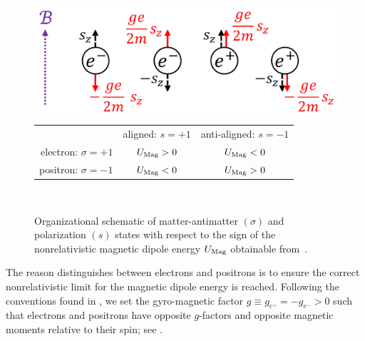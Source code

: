 \begin{figure}
 \centering
 \includegraphics[width=0.95\linewidth]{plots/schematic.png}\Bstrut\\
 \begin{tabular}{ r|c|c| }
 \multicolumn{1}{r}{}
 & \multicolumn{1}{c}{aligned: $s=+1$}
 & \multicolumn{1}{c}{anti-aligned: $s=-1$} \\
 \cline{2-3}
 electron: $\sigma=+1$ & $U_{\rm Mag}>0$ & $U_{\rm Mag}<0$ \TBstrut\\
 \cline{2-3}
 positron: $\sigma=-1$ & $U_{\rm Mag}<0$ & $U_{\rm Mag}>0$ \TBstrut\\
 \cline{2-3}
 \end{tabular}\\
 \caption{Organizational schematic of matter-antimatter $(\sigma)$ and polarization $(s)$ states with respect to the sign of the nonrelativistic magnetic dipole energy $U_{\rm Mag}$ obtainable from~. }
 \label{fig:schematic}
\end{figure}

The reason  distinguishes between electrons and positrons is to ensure the correct nonrelativistic limit for the magnetic dipole energy is reached. Following the conventions found in \cite{Tiesinga:2021myr}, we set the gyro-magnetic factor $g\equiv g_{e^{+}}=-g_{e^{-}}>0$ such that electrons and positrons have opposite $g$-factors and opposite magnetic moments relative to their spin; see .

